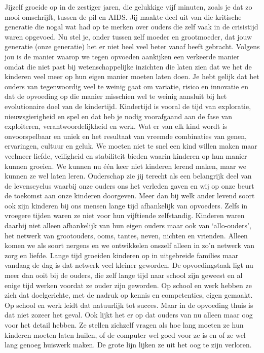 \documentclass[]{book}
\begin{document}
Jijzelf groeide op in de zestiger jaren, die gelukkige vijf minuten,
zoals je dat zo mooi omschrijft, tussen de pil en AIDS. Jij maakte deel
uit van die kritische generatie die nogal wat had op te merken over
ouders die zelf vaak in de crisistijd waren opgevoed. Nu stel je, onder
tussen zelf moeder en grootmoeder, dat jouw generatie (onze generatie)
het er niet heel veel beter vanaf heeft gebracht. Volgens jou is de
manier waarop we tegen opvoeden aankijken een verkeerde manier omdat die
niet past bij wetenschappelijke inzichten die laten zien dat we het de
kinderen veel meer op hun eigen manier moeten laten doen. Je hebt gelijk
dat het ouders van tegenwoordig veel te weinig gaat om variatie, risico
en innovatie en dat de opvoeding op die manier misschien wel te weinig
aansluit bij het evolutionaire doel van de kindertijd. Kindertijd is
vooral de tijd van exploratie, nieuwsgierigheid en spel en dat heb je
nodig voorafgaand aan de fase van exploiteren, verantwoordelijkheid en
werk. Wat er van elk kind wordt is onvoorspelbaar en uniek en het
resultaat van vreemde combinaties van genen, ervaringen, cultuur en
geluk. We moeten niet te snel een kind willen maken maar veelmeer
liefde, veiligheid en stabiliteit bieden waarin kinderen op hun manier
kunnen groeien. We kunnen nu één keer niet kinderen lerend maken, maar
we kunnen ze wel laten leren. Ouderschap zie jij terecht als een
belangrijk deel van de levenscyclus waarbij onze ouders ons het verleden
gaven en wij op onze beurt de toekomst aan onze kinderen doorgeven. Meer
dan bij welk ander levend soort ook zijn kinderen bij ons mensen lange
tijd afhankelijk van opvoeders. Zelfs in vroegere tijden waren ze niet
voor hun vijftiende zelfstandig. Kinderen waren daarbij niet alleen
afhankelijk van hun eigen ouders maar ook van `allo-ouders', het netwerk
van grootouders, ooms, tantes, neven, nichten en vrienden. Alleen komen
we als soort nergens en we ontwikkelen onszelf alleen in zo'n netwerk
van zorg en liefde. Lange tijd groeiden kinderen op in uitgebreide
families maar vandaag de dag is dat netwerk veel kleiner geworden. De
opvoedingstaak ligt nu meer dan ooit bij de ouders, die zelf lange tijd
naar school zijn geweest en al enige tijd werken voordat ze ouder zijn
geworden. Op school en werk hebben ze zich dat doelgerichte, met de
nadruk op kennis en competenties, eigen gemaakt. Op school en werk leidt
dat natuurlijk tot succes. Maar in de opvoeding thuis is dat niet zozeer
het geval. Ook lijkt het er op dat ouders van nu alleen maar oog voor
het detail hebben. Ze stellen zichzelf vragen als hoe lang moeten ze hun
kinderen moeten laten huilen, of de computer wel goed voor ze is en of
ze wel lang genoeg huiswerk maken. De grote lijn lijken ze uit het oog
te zijn verloren.
\end{document}
